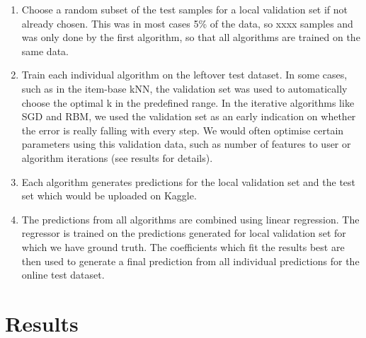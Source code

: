 \documentclass[10pt,conference,compsocconf]{IEEEtran}
\begin{document}
\begin{enumerate}
\item Choose a random subset of the test samples for a local validation set if not already chosen. This was in most cases 5\% of the data, so xxxx samples and was only done by the first algorithm, so that all algorithms are trained on the same data.

\item Train each individual algorithm on the leftover test dataset. In some cases, such as in the item-base kNN, the validation set was used to automatically choose the optimal k in the predefined range. In the iterative algorithms like SGD and RBM, we used the validation set as an early indication on whether the error is really falling with every step. We would often optimise certain parameters using this validation data, such as number of features to user or algorithm iterations (see results for details).

\item Each algorithm generates predictions for the local validation set and the test set which would be uploaded on Kaggle.

\item The predictions from all algorithms are combined using linear regression. The regressor is trained on the predictions generated for local validation set for which we have ground truth. The coefficients which fit the results best are then used to generate a final prediction from all individual predictions for the online test dataset.

\end{enumerate}



\section{Results}
\label{sec:results}
\end{document}
